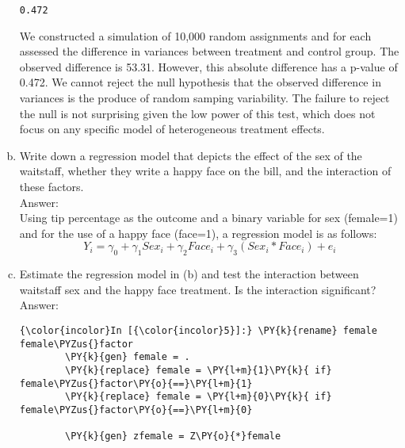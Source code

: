 \documentclass[11pt,notitlepage]{article}\usepackage[]{graphicx}\usepackage[]{color}
\makeatletter
\newenvironment{kframe}{%
 \def\at@end@of@kframe{}%
 \ifinner\ifhmode%
  \def\at@end@of@kframe{\end{minipage}}%
  \begin{minipage}{\columnwidth}%
 \fi\fi%
 \def\FrameCommand##1{\hskip\@totalleftmargin \hskip-\fboxsep
 \colorbox{shadecolor}{##1}\hskip-\fboxsep
     \hskip-\linewidth \hskip-\@totalleftmargin \hskip\columnwidth}%
 \MakeFramed {\advance\hsize-\width
   \@totalleftmargin\z@ \linewidth\hsize
   \@setminipage}}%
 {\par\unskip\endMakeFramed%
 \at@end@of@kframe}
\newenvironment{knitrout}{}{} %
\makeatother
\begin{document}
\begin{enumerate}[a)]
\begin{knitrout}
\begin{kframe}
    \begin{Verbatim}[commandchars=\\\{\}]
   0.472

    \end{Verbatim}
\end{kframe}
\end{knitrout}

We constructed a simulation of 10,000 random assignments and for each assessed the difference in variances between treatment and control group. The observed difference is 53.31. However, this absolute difference has a p-value of 0.472.  We cannot reject the null hypothesis that the observed difference in variances is the produce of random samping variability. The failure to reject the null is not surprising given the low power of this test, which does not focus on any specific model of heterogeneous treatment effects.


\item Write down a regression model that depicts the effect of the sex of the waitstaff, whether they write a happy face on the bill, and the interaction of these factors.\\
Answer:\\
Using tip percentage as the outcome and a binary variable for sex (female=1) and for the use of a happy face (face=1), a regression model is as follows: 
\begin{equation}
Y_i = \gamma_0 + \gamma_1 Sex_i + \gamma_2 Face_i + \gamma_3 (Sex_i * Face_i) + e_i
\end{equation}

\item Estimate the regression model in (b) and test the interaction between waitstaff sex and the happy face treatment. Is the interaction significant? \\
Answer:\\
\begin{knitrout}
\color{fgcolor}\begin{kframe}
    \begin{Verbatim}[commandchars=\\\{\}]
{\color{incolor}In [{\color{incolor}5}]:} \PY{k}{rename} female female\PYZus{}factor
        \PY{k}{gen} female = .
        \PY{k}{replace} female = \PY{l+m}{1}\PY{k}{ if} female\PYZus{}factor\PY{o}{==}\PY{l+m}{1}
        \PY{k}{replace} female = \PY{l+m}{0}\PY{k}{ if} female\PYZus{}factor\PY{o}{==}\PY{l+m}{0}
        
        \PY{k}{gen} zfemale = Z\PY{o}{*}female
\end{Verbatim}


\end{kframe}
\end{knitrout}
\end{enumerate}
\end{document}

